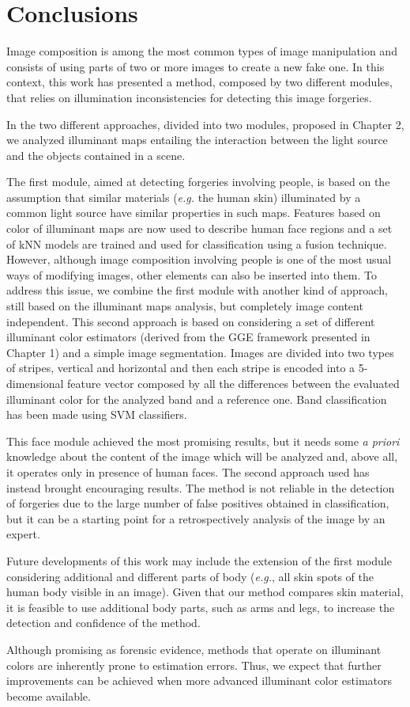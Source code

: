 \chapter*{Conclusions}

Image composition is among the most common types of image manipulation and consists of using parts of two or more images to create a new fake one. In this context, this work has presented a method, composed by two different modules, that relies on illumination inconsistencies for detecting this image forgeries.

In the two different approaches, divided into two modules, proposed in Chapter 2, we analyzed illuminant maps entailing the interaction between the light source and the objects contained in a scene. 

The first module, aimed at detecting forgeries involving people, is based on the assumption that similar materials (\emph{e.g.} the human skin) illuminated by a common light source have similar properties in such maps. Features based on color of illuminant maps are now used to describe human face regions and a set of kNN models are trained and used for classification using a fusion technique. However, although image composition involving people is one of the most usual ways of modifying images, other elements can also be inserted into them. To address this issue, we combine the first module with another kind of approach, still based on the illuminant maps analysis, but completely image content independent. This second approach is based on considering a set of different illuminant color estimators (derived from the GGE framework presented in Chapter 1) and a simple image segmentation. Images are divided into two types of stripes, vertical and horizontal and then each stripe is encoded into a 5-dimensional feature vector composed by all the differences between the evaluated illuminant color for the analyzed band and a reference one. Band classification has been made using SVM classifiers.

This face module achieved the most promising results, but it needs some \emph{a priori} knowledge about the content of the image which will be analyzed and, above all, it operates only in presence of human faces. The second approach used has instead brought encouraging results. The method is not reliable in the detection of forgeries due to the large number of false positives obtained in classification, but it can be a starting point for a retrospectively analysis of the image by an expert.

Future developments of this work may include the extension of the first module considering additional and different parts of body (\emph{e.g.}, all skin spots of the human body visible in an image). Given that our method compares skin material, it is feasible to use additional body parts, such as arms and legs, to increase the detection and confidence of the method.

Although promising as forensic evidence, methods that operate on illuminant colors are inherently prone to estimation errors. Thus, we expect that further improvements can be achieved when more advanced illuminant color estimators become available.